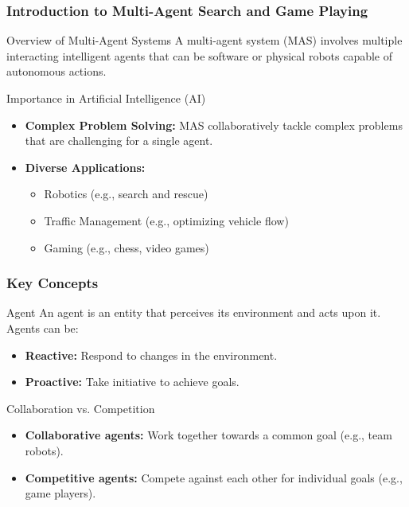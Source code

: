 \documentclass[aspectratio=169]{beamer}
\begin{document}
\frame{\titlepage}

\begin{frame}[fragile]
    \frametitle{Introduction to Multi-Agent Search and Game Playing}
    \begin{block}{Overview of Multi-Agent Systems}
        A multi-agent system (MAS) involves multiple interacting intelligent agents that can be software or physical robots capable of autonomous actions.
    \end{block}
    
    \begin{block}{Importance in Artificial Intelligence (AI)}
        \begin{itemize}
            \item \textbf{Complex Problem Solving:} MAS collaboratively tackle complex problems that are challenging for a single agent.
            \item \textbf{Diverse Applications:}
            \begin{itemize}
                \item Robotics (e.g., search and rescue)
                \item Traffic Management (e.g., optimizing vehicle flow)
                \item Gaming (e.g., chess, video games)
            \end{itemize}
        \end{itemize}
    \end{block}
\end{frame}

\begin{frame}[fragile]
    \frametitle{Key Concepts}
    \begin{block}{Agent}
        An agent is an entity that perceives its environment and acts upon it. Agents can be:
        \begin{itemize}
            \item \textbf{Reactive:} Respond to changes in the environment.
            \item \textbf{Proactive:} Take initiative to achieve goals.
        \end{itemize}
    \end{block}
    
    \begin{block}{Collaboration vs. Competition}
        \begin{itemize}
            \item \textbf{Collaborative agents:} Work together towards a common goal (e.g., team robots).
            \item \textbf{Competitive agents:} Compete against each other for individual goals (e.g., game players).
        \end{itemize}
    \end{block}
\end{frame}
\end{document}
